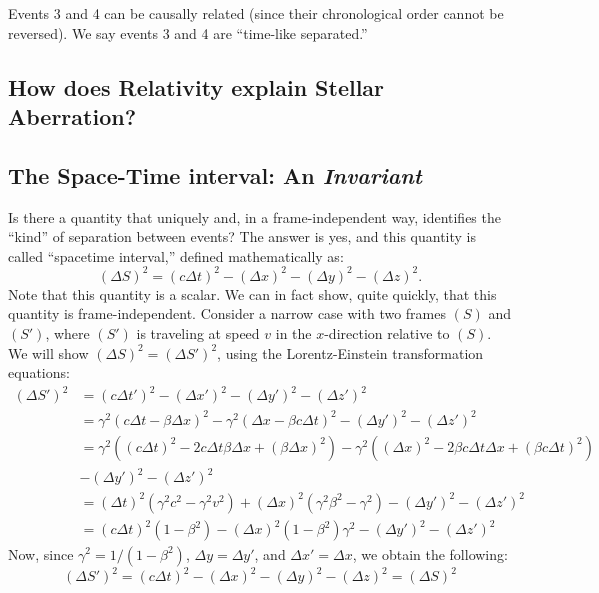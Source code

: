 \documentclass[a4paper,11pt]{article}
\numberwithin{equation}{section}
\begin{document}
\noindent Events 3 and 4 can be causally related (since their chronological order cannot be reversed). We say events 3 and 4 are ``time-like separated.''

 
 \subsection{How does Relativity explain Stellar Aberration?}
 
 \subsection{The Space-Time interval: An \textit{Invariant}}
 Is there a quantity that uniquely and, in a frame-independent way, identifies the ``kind'' of separation between events? The answer is yes, and this quantity is called ``spacetime interval,'' defined mathematically as:
 \begin{equation}
 (\Delta S)^2=(c\Delta t)^2-(\Delta x)^2 - (\Delta y)^2 - (\Delta z)^2.
 \end{equation}
 Note that this quantity is a scalar. We can in fact show, quite quickly, that this quantity is frame-independent. Consider a narrow case with two frames $(S)$ and $(S')$, where $(S')$ is traveling at speed $v$ in the $x$-direction relative to $(S)$. We will show $(\Delta S)^2 = (\Delta S')^2$, using the Lorentz-Einstein transformation equations:
 \begin{equation}
 \begin{split}
 (\Delta S')^2&=(c\Delta t')^2-(\Delta x')^2-(\Delta y')^2-(\Delta z')^2 \\
 &=\gamma^2(c\Delta t-\beta \Delta x)^2-\gamma^2(\Delta x - \beta c\Delta t)^2-(\Delta y')^2-(\Delta z')^2 \\ 
 &=\gamma^2((c\Delta t)^2-2c\Delta t\beta \Delta x+(\beta \Delta x)^2)-\gamma^2((\Delta x)^2 -2\beta c\Delta t \Delta x + (\beta c\Delta t)^2)\\&-(\Delta y')^2-(\Delta z')^2 \\
 &=(\Delta t)^2(\gamma^2 c^2 - \gamma^2 v^2)+(\Delta x)^2(\gamma^2\beta^2 - \gamma^2)-(\Delta y')^2-(\Delta z')^2\\
 &= (c\Delta t)^2(1-\beta^2)-(\Delta x)^2(1-\beta^2)\gamma^2-(\Delta y')^2-(\Delta z')^2
 \end{split}
 \end{equation}
 Now, since $\gamma^2=1/(1-\beta^2)$, $\Delta y = \Delta y'$, and $\Delta x' = \Delta x$, we obtain the following:
 \begin{equation}
 (\Delta S')^2=(c\Delta t)^2-(\Delta x)^2-(\Delta y)^2-(\Delta z)^2 = (\Delta S)^2
 \end{equation}
 
\end{document}
